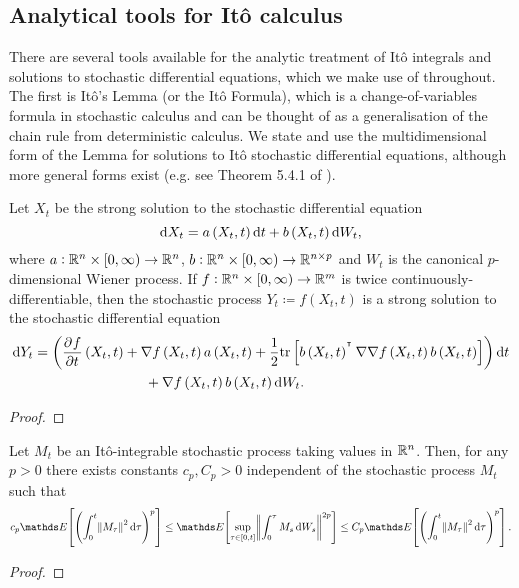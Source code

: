 \subsection{Analytical tools for It\^o calculus}
There are several tools available for the analytic treatment of It\^o integrals and solutions to stochastic differential equations, which we make use of throughout.
The first is It\^o's Lemma (or the It\^o Formula), which is a change-of-variables formula in stochastic calculus and can be thought of as a generalisation of the chain rule from deterministic calculus.
We state and use the multidimensional form of the Lemma for solutions to It\^o stochastic differential equations, although more general forms exist (e.g. see Theorem 5.4.1 of \cite{KallianpurSundar_2014_StochasticAnalysisDiffusion}).
\begin{theorem}[It\^o's Lemma]
	Let \(X_t\) be the strong solution to the stochastic differential equation
	\[
		\dif X_t = a\left(X_t, t\right)\dif t + b\left(X_t, t\right)\dif W_t,
	\]
	where \(a: \mathbb{R}^n \times [0,\infty) \to \mathbb{R}^n\), \(b: \mathbb{R}^n \times [0,\infty) \to \mathbb{R}^{n\times p}\) and \(W_t\) is the canonical \(p\)-dimensional Wiener process.
	If \(f: \mathbb{R}^n \times [0, \infty) \to \mathbb{R}^m\) is twice continuously-differentiable, then the stochastic process \(Y_t \coloneqq f\left(X_t, t\right)\) is a strong solution to the stochastic differential equation
	\begin{align*}
		\dif Y_t & = \left(\dpd{f}{t}\left(X_t, t\right) + \nabla f\left(X_t, t\right) a\left(X_t, t\right) + \frac12\mathrm{tr}\left[b\left(X_t, t\right)^{\T} \nabla\nabla f\left(X_t, t\right) b\left(X_t, t\right)\right] \right)\dif t \\
		         & \qquad\qquad\qquad\qquad + \nabla f\left(X_t, t\right)b\left(X_t, t\right) \dif W_t.
	\end{align*}
\end{theorem}
\begin{proof}

\end{proof}



\begin{theorem}
	Let \(M_t\) be an It\^o-integrable stochastic process taking values in \(\mathbb{R}^n\).
	Then, for any \(p > 0\) there exists constants \(c_p, C_p > 0\) independent of the stochastic process \(M_t\) such that
	\[
		c_p\avg{\left(\int_0^t{\norm{M_\tau}^2\dif \tau}\right)^p} \leq \avg{\sup_{\tau \in \left[0, t\right]}\norm{\int_0^\tau{M_s\dif W_s}}^{2p}} \leq C_p\avg{\left(\int_0^t{\norm{M_\tau}^2\dif \tau}\right)^p}.
	\]
\end{theorem}
\begin{proof}

\end{proof}


